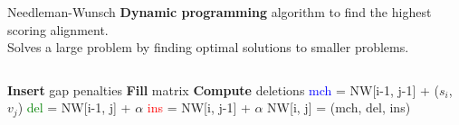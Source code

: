 \documentclass[aspectratio=169,font=14pt]{beamer}
\begin{document}
\begin{frame}{Needleman-Wunsch} %
\textbf{Dynamic programming} algorithm to find the highest scoring alignment.\\
Solves a large problem by finding optimal solutions to smaller problems.
\begin{columns}
        \begin{algorithmic}[1]
        \State \textbf{Insert} gap penalties
        \State \textbf{Fill} matrix
                    \State \textbf{Compute} deletions
                    \State \textcolor{blue}{mch} = NW[i-1, j-1] + ($s_i$, $v_j$)
                    \State \textcolor{green}{del} = NW[i-1, j] + $\alpha$
                    \State \textcolor{red}{ins} = NW[i, j-1] + $\alpha$
                    \State NW[i, j] = (mch, del, ins)
                \EndFor
            \EndFor
        \end{algorithmic}
\end{columns}
\end{frame} %
\end{document}
